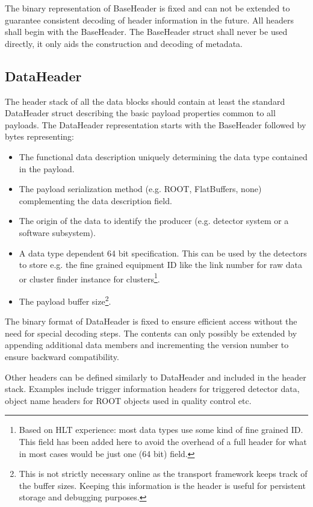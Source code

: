 \documentclass[a4paper,twoside]{article}
\begin{document}
The binary representation of BaseHeader is fixed and can not be extended to guarantee consistent decoding of header information in the future. All headers shall begin with the BaseHeader. The BaseHeader struct shall never be used directly, it only aids the construction and decoding of metadata.

\subsection{DataHeader}
The header stack of all the data blocks should contain at least the standard DataHeader struct describing the basic payload properties common to all payloads.
The DataHeader representation starts with the BaseHeader followed by bytes representing:
\begin{itemize}
  \item The functional data description uniquely determining the data type contained in the payload.
  \item The payload serialization method (e.g. ROOT, FlatBuffers, none) complementing the data description field.
  \item The origin of the data to identify the producer (e.g. detector system or a software subsystem).
  \item A data type dependent 64 bit specification. This can be used by the detectors to store e.g. the fine grained equipment ID like the link number for raw data or cluster finder instance for clusters\footnote{Based on HLT experience: most data types use some kind of fine grained ID. This field has been added here to avoid the overhead of a full header for what in most cases would be just one (64 bit) field.}.
  \item The payload buffer size\footnote{This is not strictly necessary online as the transport framework keeps track of the buffer sizes. Keeping this information is the header is useful for persistent storage and debugging purposes.}.
\end{itemize}

The binary format of DataHeader is fixed to ensure efficient access without the need for special decoding steps. The contents can only possibly be extended by appending additional data members and incrementing the version number to ensure backward compatibility.

Other headers can be defined similarly to DataHeader and included in the header stack. Examples include trigger information headers for triggered detector data, object name headers for ROOT objects used in quality control etc.
\end{document}
